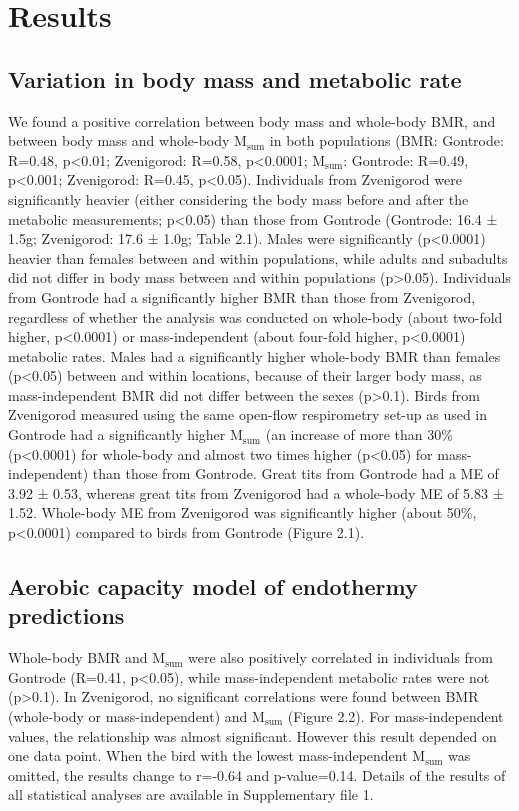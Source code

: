 \documentclass[10pt, twoside]{book} %
\begin{document}
\section{Results}
\subsection{Variation in body mass and metabolic rate}

We found a positive correlation between body mass and whole-body BMR, and between body mass and whole-body M$_{\text{sum}}$ in both populations (BMR: Gontrode: R=0.48, p<0.01; Zvenigorod: R=0.58, p<0.0001; M$_{\text{sum}}$: Gontrode: R=0.49, p<0.001; Zvenigorod: R=0.45, p<0.05). Individuals from Zvenigorod were significantly heavier (either considering the body mass before and after the metabolic measurements; p<0.05) than those from Gontrode (Gontrode: 16.4 ± 1.5g; Zvenigorod: 17.6 ± 1.0g; Table 2.1). Males were significantly (p<0.0001) heavier than females between and within populations, while adults and subadults did not differ in body mass between and within populations (p>0.05). Individuals from Gontrode had a significantly higher BMR than those from Zvenigorod, regardless of whether the analysis was conducted on whole-body (about two-fold higher, p<0.0001) or mass-independent (about four-fold higher, p<0.0001) metabolic rates. Males had a significantly higher whole-body BMR than females (p<0.05) between and within locations, because of their larger body mass, as mass-independent BMR did not differ between the sexes (p>0.1). Birds from Zvenigorod measured using the same open-flow respirometry set-up as used in Gontrode had a significantly higher M$_{\text{sum}}$ (an increase of more than 30\% (p<0.0001) for whole-body and almost two times higher (p<0.05) for mass-independent) than those from Gontrode. Great tits from Gontrode had a ME of 3.92 ± 0.53, whereas great tits from Zvenigorod had a whole-body ME of 5.83 ± 1.52. Whole-body ME from Zvenigorod was significantly higher (about 50\%, p<0.0001) compared to birds from Gontrode (Figure 2.1). \\
\subsection{Aerobic capacity model of endothermy predictions}

Whole-body BMR and M$_{\text{sum}}$ were also positively correlated in individuals from Gontrode (R=0.41, p<0.05), while mass-independent metabolic rates were not (p>0.1). In Zvenigorod, no significant correlations were found between BMR (whole-body or mass-independent) and M$_{\text{sum}}$ (Figure 2.2). For mass-independent values, the relationship was almost significant. However this result depended on one data point. When the bird with the lowest mass-independent M$_{\text{sum}}$ was omitted, the results change to r=-0.64 and p-value=0.14. Details of the results of all statistical analyses are available in Supplementary file 1.\\
\end{document}
